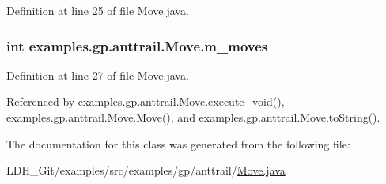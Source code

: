 Definition at line 25 of file Move.\-java.

\hypertarget{classexamples_1_1gp_1_1anttrail_1_1_move_aeb46ce59b9a65f47d7941c2fcf59c952}{
\subsubsection[{m\-\_\-moves}]{\setlength{\rightskip}{0pt plus 5cm}int examples.\-gp.\-anttrail.\-Move.\-m\-\_\-moves\hspace{0.3cm}{\ttfamily [private]}}}\label{classexamples_1_1gp_1_1anttrail_1_1_move_aeb46ce59b9a65f47d7941c2fcf59c952}


Definition at line 27 of file Move.\-java.



Referenced by examples.\-gp.\-anttrail.\-Move.\-execute\-\_\-void(), examples.\-gp.\-anttrail.\-Move.\-Move(), and examples.\-gp.\-anttrail.\-Move.\-to\-String().



The documentation for this class was generated from the following file\-:\begin{DoxyCompactItemize}
\item 
L\-D\-H\-\_\-\-Git/examples/src/examples/gp/anttrail/\hyperlink{_move_8java}{Move.\-java}\end{DoxyCompactItemize}
